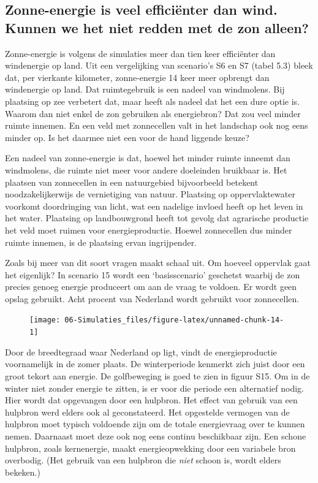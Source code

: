 \documentclass[
  11pt,
  a4paper,
]{book}
\begin{document}
\newpage

\hypertarget{zonne-energie-is-veel-efficiuxebnter-dan-wind.-kunnen-we-het-niet-redden-met-de-zon-alleen}{%
\subsection{Zonne-energie is veel efficiënter dan wind. Kunnen we het niet redden met de zon alleen?}\label{zonne-energie-is-veel-efficiuxebnter-dan-wind.-kunnen-we-het-niet-redden-met-de-zon-alleen}}

Zonne-energie is volgens de simulaties meer dan tien keer efficiënter dan windenergie op land. Uit een vergelijking van scenario's S6 en S7 (tabel 5.3) bleek dat, per vierkante kilometer, zonne-energie 14 keer meer opbrengt dan windenergie op land. Dat ruimtegebruik is een nadeel van windmolens. Bij plaatsing op zee verbetert dat, maar heeft als nadeel dat het een dure optie is. Waarom dan niet enkel de zon gebruiken als energiebron? Dat zou veel minder ruimte innemen. En een veld met zonnecellen valt in het landschap ook nog eens minder op. Is het daarmee niet een voor de hand liggende keuze?

Een nadeel van zonne-energie is dat, hoewel het minder ruimte inneemt dan windmolens, die ruimte niet meer voor andere doeleinden bruikbaar is. Het plaatsen van zonnecellen in een natuurgebied bijvoorbeeld betekent noodzakelijkerwijs de vernietiging van natuur. Plaatsing op oppervlaktewater voorkomt doordringing van licht, wat een nadelige invloed heeft op het leven in het water. Plaatsing op landbouwgrond heeft tot gevolg dat agrarische productie het veld moet ruimen voor energieproductie. Hoewel zonnecellen dus minder ruimte innemen, is de plaatsing ervan ingrijpender.

Zoals bij meer van dit soort vragen maakt schaal uit. Om hoeveel oppervlak gaat het eigenlijk? In scenario 15 wordt een `basisscenario' geschetst waarbij de zon precies genoeg energie produceert om aan de vraag te voldoen. Er wordt geen opslag gebruikt. Acht procent van Nederland wordt gebruikt voor zonnecellen.

\begin{figure}

{\centering \texttt{[image: 06-Simulaties\_files/figure-latex/unnamed-chunk-14-1]} 

}

\end{figure}

Door de breedtegraad waar Nederland op ligt, vindt de energieproductie voornamelijk in de zomer plaats. De winterperiode kenmerkt zich juist door een groot tekort aan energie. De golfbeweging is goed te zien in figuur S15. Om in de winter niet zonder energie te zitten, is er voor die periode een alternatief nodig. Hier wordt dat opgevangen door een hulpbron. Het effect van gebruik van een hulpbron werd elders ook al geconstateerd. Het opgestelde vermogen van de hulpbron moet typisch voldoende zijn om de totale energievraag over te kunnen nemen. Daarnaast moet deze ook nog eens continu beschikbaar zijn. Een schone hulpbron, zoals kernenergie, maakt energieopwekking door een variabele bron overbodig. (Het gebruik van een hulpbron die \emph{niet} schoon is, wordt elders bekeken.)
\end{document}
